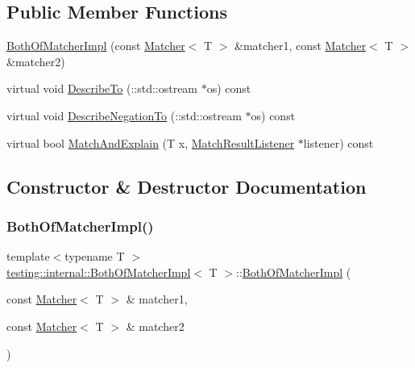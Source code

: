 \subsection*{Public Member Functions}
\begin{DoxyCompactItemize}
\item 
\hyperlink{classtesting_1_1internal_1_1_both_of_matcher_impl_a41760fcb35ba18ac2a0eb580ac61ea9a}{Both\+Of\+Matcher\+Impl} (const \hyperlink{classtesting_1_1_matcher}{Matcher}$<$ T $>$ \&matcher1, const \hyperlink{classtesting_1_1_matcher}{Matcher}$<$ T $>$ \&matcher2)
\item 
virtual void \hyperlink{classtesting_1_1internal_1_1_both_of_matcher_impl_a3a1f92f7b093d36ab38c35fbcae4ce4d}{Describe\+To} (\+::std\+::ostream $\ast$os) const
\item 
virtual void \hyperlink{classtesting_1_1internal_1_1_both_of_matcher_impl_a4f6017c7aca6e5c8166ff4c613d8dbec}{Describe\+Negation\+To} (\+::std\+::ostream $\ast$os) const
\item 
virtual bool \hyperlink{classtesting_1_1internal_1_1_both_of_matcher_impl_a4f3e5edf69d168fef8bec577313748f4}{Match\+And\+Explain} (T x, \hyperlink{classtesting_1_1_match_result_listener}{Match\+Result\+Listener} $\ast$listener) const
\end{DoxyCompactItemize}


\subsection{Constructor \& Destructor Documentation}
\mbox{\label{classtesting_1_1internal_1_1_both_of_matcher_impl_a41760fcb35ba18ac2a0eb580ac61ea9a}} 
\subsubsection{\texorpdfstring{Both\+Of\+Matcher\+Impl()}{BothOfMatcherImpl()}}
{\footnotesize\ttfamily template$<$typename T $>$ \\
\hyperlink{classtesting_1_1internal_1_1_both_of_matcher_impl}{testing\+::internal\+::\+Both\+Of\+Matcher\+Impl}$<$ T $>$\+::\hyperlink{classtesting_1_1internal_1_1_both_of_matcher_impl}{Both\+Of\+Matcher\+Impl} (\begin{DoxyParamCaption}\item[{const \hyperlink{classtesting_1_1_matcher}{Matcher}$<$ T $>$ \&}]{matcher1,  }\item[{const \hyperlink{classtesting_1_1_matcher}{Matcher}$<$ T $>$ \&}]{matcher2 }\end{DoxyParamCaption})\hspace{0.3cm}{\ttfamily [inline]}}



